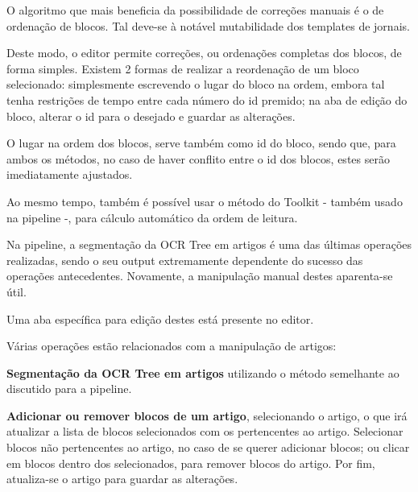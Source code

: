 

O algoritmo que mais beneficia da possibilidade de correções manuais é o de ordenação de blocos. Tal deve-se à notável mutabilidade dos templates de jornais.

Deste modo, o editor permite correções, ou ordenações completas dos blocos, de forma simples. Existem 2 formas de realizar a reordenação de um bloco selecionado: simplesmente escrevendo o lugar do bloco na ordem, embora tal tenha restrições de tempo entre cada número do id premido; na aba de edição do bloco, alterar o id para o desejado e guardar as alterações.


O lugar na ordem dos blocos, serve também como id do bloco, sendo que, para ambos os métodos, no caso de haver conflito entre o id dos blocos, estes serão imediatamente ajustados.


Ao mesmo tempo, também é possível usar o método do Toolkit - também usado na pipeline -, para cálculo automático da ordem de leitura.





Na pipeline, a segmentação da OCR Tree em artigos é uma das últimas operações realizadas, sendo o seu output extremamente dependente do sucesso das operações antecedentes. Novamente, a manipulação manual destes aparenta-se útil.

Uma aba específica para edição destes está presente no editor.

Várias operações estão relacionados com a manipulação de artigos:

\textbf{Segmentação da OCR Tree em artigos} utilizando o método semelhante ao discutido para a pipeline.


\textbf{Adicionar ou remover blocos de um artigo}, selecionando o artigo, o que irá atualizar a lista de blocos selecionados com os pertencentes ao artigo. Selecionar blocos não pertencentes ao artigo, no caso de se querer adicionar blocos; ou clicar em blocos dentro dos selecionados, para remover blocos do artigo. Por fim, atualiza-se o artigo para guardar as alterações.


